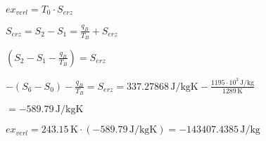 \( ex_{verl} = T_0 \cdot S_{erz} \)  

\( S_{erz} = S_2 - S_1 = \frac{q_B}{T_B} + S_{erz} \)  

\( (S_2 - S_1 - \frac{q_B}{T_B}) = S_{erz} \)  

\( - (S_6 - S_0) - \frac{q_B}{T_B} = S_{erz} = 337.27868 \, \text{J/kgK} - \frac{1195 \cdot 10^3 \, \text{J/kg}}{1289 \, \text{K}} \)  

\( = - 589.79 \, \text{J/kgK} \)  

\( ex_{verl} = 243.15 \, \text{K} \cdot (-589.79 \, \text{J/kgK}) = -143407.4385 \, \text{J/kg} \)